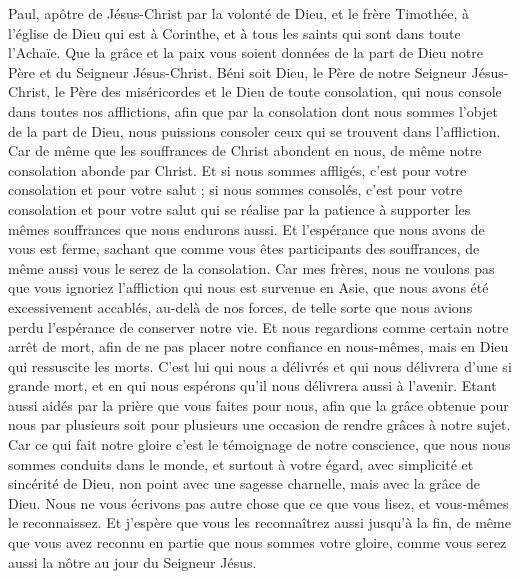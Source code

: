 \begin{multicols}{2}
\VerseOne{}Paul, apôtre de Jésus-Christ par la volonté de Dieu, et le frère Timothée, à l'église de Dieu qui est à Corinthe, et à tous les saints qui sont dans toute l'Achaïe.
Que la grâce et la paix vous soient données de la part de Dieu notre Père et du Seigneur Jésus-Christ.
Béni soit Dieu, le Père de notre Seigneur Jésus-Christ, le Père des miséricordes et le Dieu de toute consolation,
qui nous console dans toutes nos afflictions, afin que par la consolation dont nous sommes l’objet de la part de Dieu, nous puissions consoler ceux qui se trouvent dans l’affliction.
Car de même que les souffrances de Christ abondent en nous, de même notre consolation abonde par Christ.
Et si nous sommes affligés, c'est pour votre consolation et pour votre salut ; si nous sommes consolés, c'est pour votre consolation et pour votre salut qui se réalise par la patience à supporter les mêmes souffrances que nous endurons aussi.
Et l'espérance que nous avons de vous est ferme, sachant que comme vous êtes participants des souffrances, de même aussi vous le serez de la consolation.
Car mes frères, nous ne voulons pas que vous ignoriez l’affliction qui nous est survenue en Asie, que nous avons été excessivement accablés, au-delà de nos forces, de telle sorte que nous avions perdu l'espérance de conserver notre vie.
Et nous regardions comme certain notre arrêt de mort, afin de ne pas placer notre confiance en nous-mêmes, mais en Dieu qui ressuscite les morts.
C’est lui qui nous a délivrés et qui nous délivrera d'une si grande mort, et en qui nous espérons qu'il nous délivrera aussi à l'avenir.
Etant aussi aidés par la prière que vous faites pour nous, afin que la grâce obtenue pour nous par plusieurs soit pour plusieurs une occasion de rendre grâces à notre sujet.
Car ce qui fait notre gloire c’est le témoignage de notre conscience, que nous nous sommes conduits dans le monde, et surtout à votre égard, avec simplicité et sincérité de Dieu, non point avec une sagesse charnelle, mais avec la grâce de Dieu.
Nous ne vous écrivons pas autre chose que ce que vous lisez, et vous-mêmes le reconnaissez. Et j'espère que vous les reconnaîtrez aussi jusqu'à la fin,
de même que vous avez reconnu en partie que nous sommes votre gloire, comme vous serez aussi la nôtre au jour du Seigneur Jésus.

\end{multicols}

